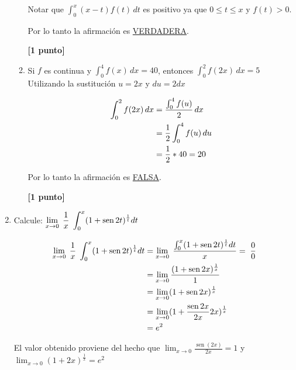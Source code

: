 \documentclass[letterpaper,10pt]{article}
\newcommand{\dis}{\displaystyle}
\def\sin{\operatorname{sen}}
\begin{document}
\begin{enumerate}
\begin{enumerate}[label=\emph{\alph*)}]
Notar que $\displaystyle \int_{0}^{x} (x-t)f(t)\, dt$ es positivo ya que $0 \leq t \leq x$ y $f(t)>0$.

Por lo tanto la afirmación es \underline{VERDADERA}.

\dotfill\textbf{[1 punto]}



\item Si $f$ es continua y $\int_{0}^{4} f(x)\, dx = 40$, entonces $\int_{0}^{2} f(2x)\, dx = 5$\\

Utilizando la sustitución $u = 2x$ y $du = 2 dx $

\begin{align*}
 \dis  \int_{0}^{2} f(2x)\, dx  &= \frac{\int_{0}^{4} f(u)}{2}\, dx\\
 \dis    &= \frac{1}{2}\int_{0}^{4} f(u)\, du\\
 \dis    &= \frac{1}{2}* 40 = 20\\
\end{align*}

Por lo tanto la afirmación es \underline{FALSA}.

\dotfill\textbf{[1 punto]}

\end{enumerate}
\vspace{2mm}







\item Calcule:
$\displaystyle \lim_{x\to 0} \; {1\over x} \; \int ^x_0 (1 + \sin
2t)^{{1\over t}} dt$

\begin{align*}
 \dis  \displaystyle \lim_{x\to 0} \; {1\over x} \; \int ^x_0 (1 + \sin 2t)^{{1\over t}} dt  &= \displaystyle \lim_{x\to 0} \; \frac{ \int ^x_0 (1 + \sin 2t)^{{1\over t}} dt}{x} = \; {0\over 0}\\
 \dis    &= \displaystyle \lim_{x\to 0} \frac{(1 + \sin 2x)^{{1\over x}}}{1}\\
 \dis    &= \displaystyle \lim_{x\to 0}  (1 + \sin 2x)^{{1\over x}}\\
 \dis    &= \displaystyle \lim_{x\to 0}  (1 + \frac{\sin 2x}{2x} 2x)^{{1\over x}}\\
 \dis    &= e^2
\end{align*}

El valor obtenido proviene del hecho que $\displaystyle \lim_{x\to 0} \frac{\sin(2x)}{2x}=1$ y $\displaystyle \lim_{x\to 0} \left(1+2x\right)^{\frac{1}{x}} = e^2$


\end{enumerate}
\end{document}

